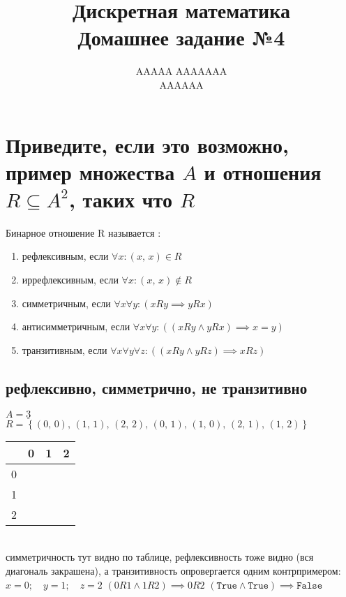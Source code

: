 \documentclass{article}
\title{Дискретная математика \\ Домашнее задание №4}
\author{AAAAA AAAAAAA \\ AAAAAA}
\newcommand{\ds}{\displaystyle}
\newcommand{\range}{\underline}
\newcommand{\pe}[2]{({#1},\, {#2})}
\newcommand{\p}[2]{\pe{#1}{#2},\,}
\newcommand{\K}{\cellcolor{black}}
\renewcommand{\l}{\left}
\renewcommand{\r}{\right}
\begin{document}
  \maketitle

  \section{Приведите, если это возможно, пример множества $A$ и отношения $R \subseteq A^2$, таких что $R$}
  Бинарное отношение R называется \cite{dashkov}:
  \begin{enumerate}
    \item рефлексивным, если $\forall x: (x,\, x) \in R$
    \item иррефлексивным, если $\forall x: (x,\, x) \not\in R$
    \item симметричным, если $\forall x\forall y: (xRy \implies yRx)$
    \item антисимметричным, если $\forall x\forall y: ((xRy \land yRx) \implies x=y)$
    \item транзитивным, если $\forall x\forall y\forall z: ((xRy \land yRz) \implies xRz)$
  \end{enumerate}
  \subsection{рефлексивно, симметрично, не транзитивно}
  $\ds A = \range{3}$ \\
  $\ds R = \l\{\p{0}{0} \p{1}{1} \p{2}{2} \p{0}{1} \p{1}{0} \p{2}{1} \pe{1}{2} \r\}$ \\
  \setlength\tabcolsep{4pt}
  \begin{tabular}{|c|c|c|c|}
    \hline
      & 0 & 1 & 2 \\ \hline
    0 &\K &\K &   \\ \hline
    1 &\K &\K &\K \\ \hline
    2 &   &\K &\K \\ \hline
  \end{tabular}
  \setlength\tabcolsep{6pt} \\
  симметричность тут видно по таблице, рефлексивность тоже видно (вся диагональ закрашена), а транзитивность опровергается одним контрпримером: \\
  $\ds x = 0;\quad y = 1;\quad z = 2$ \hfill
  $\ds (0R1 \land 1R2) \implies 0R2$ \hfill
  $\ds (\texttt{True} \land \texttt{True}) \implies \texttt{False}$
\end{document}
